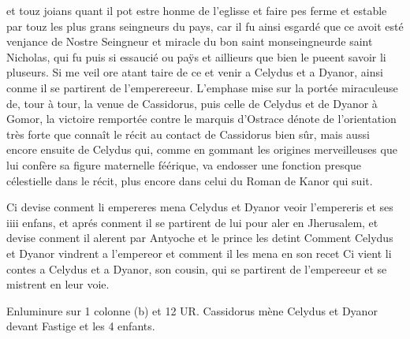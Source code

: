 \documentclass{article}
\begin{document}
\begin{pages}
   et touz joians quant il pot estre honme de l’eglisse et faire pes ferme et estable par touz les plus grans seingneurs du pays, 
   car il fu ainsi esgardé que ce avoit esté venjance de Nostre Seingneur et miracle 
   du bon saint monseingneurde 
   saint Nicholas, qui fu puis si essaucié ou paÿs et aillieurs que bien le pueent savoir li 
   pluseurs. Si me veil ore atant taire de ce et venir a Celydus 
   et a Dyanor, ainsi conme il se partirent de l’emperereeur.
   L'emphase mise sur la portée miraculeuse de, tour à tour, la venue de Cassidorus, puis celle de Celydus 
   et de Dyanor à Gomor, la victoire remportée contre le marquis d'Ostrace dénote de l'orientation très forte que connaît le récit au 
   contact de Cassidorus bien sûr, mais aussi encore ensuite de Celydus qui, comme en gommant les origines merveilleuses que lui confère
   sa figure maternelle féérique, va endosser une fonction presque célestielle dans le récit, plus encore dans celui du Roman 
   de Kanor qui suit. \pend 

         
            Ci devise conment li empereres
               mena Celydus et Dyanor 
               veoir l’empereris et ses iiii enfans, 
               et aprés conment il se partirent de lui pour aler en Jherusalem, 
               et devise conment il alerent par Antyoche 
               et le prince les detint
               Comment Celydus et Dyanor vindrent a l'empereor et comment il les mena en son recet
               Ci vient li contes a Celydus et a Dyanor, son cousin, qui se partirent de l'empereeur
               et se mistrent en leur voie.
            
               Enluminure sur 1 colonne (b) et 12 UR. Cassidorus mène Celydus et Dyanor devant Fastige et les 4 enfants.
            

\end{pages}
\end{document}
